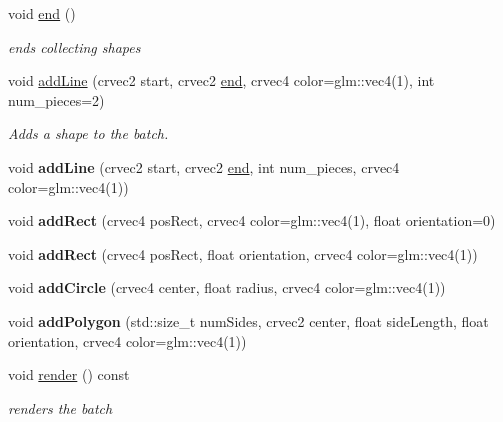 \begin{DoxyCompactItemize}
void \hyperlink{classnta_1_1DebugBatch_abc2f517c6dd1fb4a65624335d11c92f1}{end} ()
\begin{DoxyCompactList}\small\item\em ends collecting shapes \end{DoxyCompactList}\item 
\mbox{\label{classnta_1_1DebugBatch_abc7c94706f334db36992b486885868a2}} 
void \hyperlink{classnta_1_1DebugBatch_abc7c94706f334db36992b486885868a2}{add\+Line} (crvec2 start, crvec2 \hyperlink{classnta_1_1DebugBatch_abc2f517c6dd1fb4a65624335d11c92f1}{end}, crvec4 color=glm\+::vec4(1), int num\+\_\+pieces=2)
\begin{DoxyCompactList}\small\item\em Adds a shape to the batch. \end{DoxyCompactList}\item 
\mbox{\label{classnta_1_1DebugBatch_aeb4dbbdb8501560147df6ae3c37f706e}} 
void {\bfseries add\+Line} (crvec2 start, crvec2 \hyperlink{classnta_1_1DebugBatch_abc2f517c6dd1fb4a65624335d11c92f1}{end}, int num\+\_\+pieces, crvec4 color=glm\+::vec4(1))
\item 
\mbox{\label{classnta_1_1DebugBatch_afd4376b4d4532995c7a7ca2766627d48}} 
void {\bfseries add\+Rect} (crvec4 pos\+Rect, crvec4 color=glm\+::vec4(1), float orientation=0)
\item 
\mbox{\label{classnta_1_1DebugBatch_a8b83a2974e7eaaa5bca4bd8038bda51d}} 
void {\bfseries add\+Rect} (crvec4 pos\+Rect, float orientation, crvec4 color=glm\+::vec4(1))
\item 
\mbox{\label{classnta_1_1DebugBatch_a3ec7d0db2c40fde5d5a636b19ba735b1}} 
void {\bfseries add\+Circle} (crvec4 center, float radius, crvec4 color=glm\+::vec4(1))
\item 
\mbox{\label{classnta_1_1DebugBatch_af610dfb8caf64615bc14cd96eee2a432}} 
void {\bfseries add\+Polygon} (std\+::size\+\_\+t num\+Sides, crvec2 center, float side\+Length, float orientation, crvec4 color=glm\+::vec4(1))
\item 
\mbox{\label{classnta_1_1DebugBatch_a3188990f4fd9aeede13573fe00bd0cf4}} 
void \hyperlink{classnta_1_1DebugBatch_a3188990f4fd9aeede13573fe00bd0cf4}{render} () const
\begin{DoxyCompactList}\small\item\em renders the batch \end{DoxyCompactList}\end{DoxyCompactItemize}
